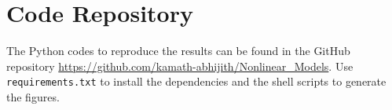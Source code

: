 \documentclass[12pt, a4 paper]{article}
\begin{document}


\section{Code Repository}
The Python codes to reproduce the results can be found in the GitHub repository \url{https://github.com/kamath-abhijith/Nonlinear_Models}. Use \texttt{requirements.txt} to install the dependencies and the shell scripts to generate the figures.
\end{document}
